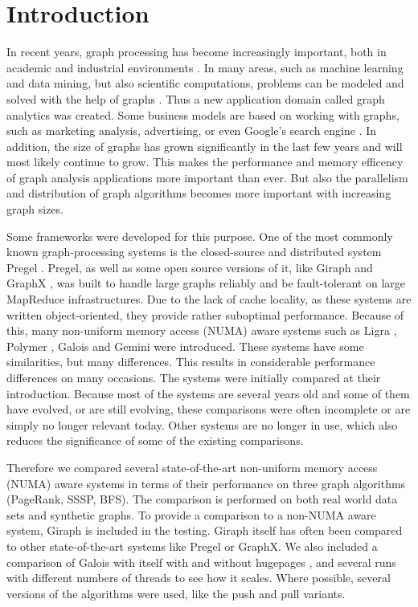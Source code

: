 \section{Introduction}
In recent years, graph processing has become increasingly important, both in academic and industrial environments \cite{Gemini}.
In many areas, such as machine learning and data mining, but also scientific computations, problems can be modeled and solved with the help of graphs \cite{Polymer}.
Thus a new application domain called graph analytics was created.
Some business models are based on working with graphs, such as marketing analysis, advertising, or even Google's search engine \cite{pagerank}.
In addition, the size of graphs has grown significantly in the last few years and will most likely continue to grow.
This makes the performance and memory efficency of graph analysis applications more important than ever.
But also the parallelism and distribution of graph algorithms becomes more important with increasing graph sizes.

Some frameworks were developed for this purpose.
One of the most commonly known graph-processing systems is the closed-source and distributed system Pregel \cite{pregel}.
Pregel, as well as some open source versions of it, like Giraph \cite{Giraph} and GraphX \cite{graphx}, was built to handle large graphs reliably and be fault-tolerant on large MapReduce infrastructures.
Due to the lack of cache locality, as these systems are written object-oriented, they provide rather suboptimal performance.
Because of this, many non-uniform memory access (NUMA) aware systems such as Ligra \cite{Ligra}, Polymer \cite{Polymer}, Galois \cite{Galois} and Gemini \cite{Gemini} were introduced.
These systems have some similarities, but many differences. This results in considerable performance differences on many occasions.
The systems were initially compared at their introduction.
Because most of the systems are several years old and some of them have evolved, or are still evolving, these comparisons were often incomplete or are simply no longer relevant today. 
Other systems are no longer in use, which also reduces the significance of some of the existing comparisons.

Therefore we compared several state-of-the-art non-uniform memory access (NUMA) aware systems in terms of their performance on three graph algorithms (PageRank, SSSP, BFS).
The comparison is performed on both real world data sets and synthetic graphs.
To provide a comparison to a non-NUMA aware system, Giraph is included in the testing.
Giraph itself has often been compared to other state-of-the-art systems like Pregel or GraphX.
We also included a comparison of Galois with itself with and without hugepages \cite{hugepages}, and several runs with different numbers of threads to see how it scales.
Where possible, several versions of the algorithms were used, like the push and pull variants.

